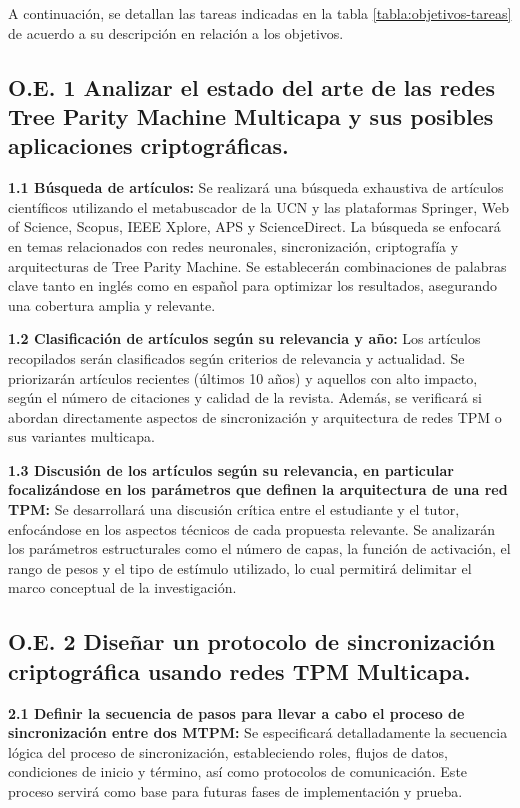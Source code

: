 A continuación, se detallan las tareas indicadas en la tabla \ref{tabla:objetivos-tareas} de acuerdo a su descripción en relación a los objetivos.

\subsection*{O.E. 1 Analizar el estado del arte de las redes Tree Parity Machine Multicapa y sus posibles aplicaciones criptográficas.}

\textbf{1.1 Búsqueda de artículos:}  
Se realizará una búsqueda exhaustiva de artículos científicos utilizando el metabuscador de la UCN y las plataformas Springer, Web of Science, Scopus, IEEE Xplore, APS y ScienceDirect. La búsqueda se enfocará en temas relacionados con redes neuronales, sincronización, criptografía y arquitecturas de Tree Parity Machine. Se establecerán combinaciones de palabras clave tanto en inglés como en español para optimizar los resultados, asegurando una cobertura amplia y relevante.

\textbf{1.2 Clasificación de artículos según su relevancia y año:}  
Los artículos recopilados serán clasificados según criterios de relevancia y actualidad. Se priorizarán artículos recientes (últimos 10 años) y aquellos con alto impacto, según el número de citaciones y calidad de la revista. Además, se verificará si abordan directamente aspectos de sincronización y arquitectura de redes TPM o sus variantes multicapa.

\textbf{1.3 Discusión de los artículos según su relevancia, en particular focalizándose en los parámetros que definen la arquitectura de una red TPM:}  
Se desarrollará una discusión crítica entre el estudiante y el tutor, enfocándose en los aspectos técnicos de cada propuesta relevante. Se analizarán los parámetros estructurales como el número de capas, la función de activación, el rango de pesos y el tipo de estímulo utilizado, lo cual permitirá delimitar el marco conceptual de la investigación.

\vspace{1em}

\subsection*{O.E. 2 Diseñar un protocolo de sincronización criptográfica usando redes TPM Multicapa.}

\textbf{2.1 Definir la secuencia de pasos para llevar a cabo el proceso de sincronización entre dos MTPM:}  
Se especificará detalladamente la secuencia lógica del proceso de sincronización, estableciendo roles, flujos de datos, condiciones de inicio y término, así como protocolos de comunicación. Este proceso servirá como base para futuras fases de implementación y prueba.

